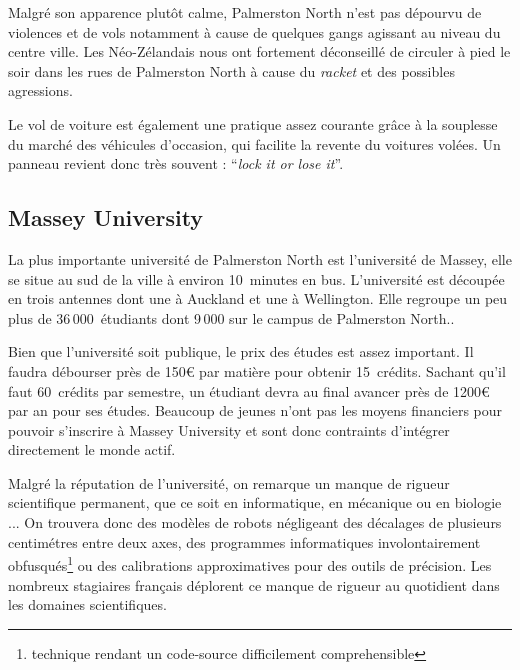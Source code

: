 \documentclass[11pt,journal]{RapportFR}
\newcommand{\Nzs}{N\'eo-Z\'elandais\xspace}
\newcommand{\PM}{Palmerston North\xspace}
\begin{document}
Malgr\'e son apparence plut\^ot calme, \PM n'est pas d\'epourvu de violences et de vols notamment \`a cause de quelques gangs agissant au niveau du centre ville.
Les \Nzs nous ont fortement déconseillé de circuler \`a pied le soir dans les rues de \PM à cause du \emph{racket} et des possibles agressions.

Le vol de voiture est également une pratique assez courante gr\^ace \`a la souplesse du march\'e des v\'ehicules d'occasion, qui facilite la revente du voitures volées. Un panneau revient donc tr\`es souvent : ``\emph{lock it or lose it}''.

\vfill

\subsection{Massey University}
\label{sub:massey}

La plus importante universit\'e de \PM est l'universit\'e de Massey, elle se situe au sud de la ville \`a environ 10~minutes en bus.
L'universit\'e est d\'ecoup\'ee en trois antennes dont une \`a Auckland et une \`a Wellington. Elle regroupe un peu plus de 36\,000~\'etudiants dont 9\,000 sur le campus de \PM..

 \vspace{-5mm}

Bien que l'universit\'e soit publique, le prix des \'etudes est assez important. Il faudra d\'ebourser pr\`es de 150\euro\xspace par mati\`ere pour obtenir 15~cr\'edits. 
Sachant qu'il faut 60~cr\'edits par semestre, un \'etudiant devra au final avancer pr\`es de 1200\euro\xspace par an pour ses \'etudes.
Beaucoup de jeunes n'ont pas les moyens financiers pour pouvoir s'inscrire \`a Massey University et sont donc contraints d'int\'egrer directement le monde actif.



Malgr\'e la r\'eputation de l'universit\'e, on remarque un manque de rigueur scientifique permanent, que ce soit en informatique, en m\'ecanique ou en biologie ...
On trouvera donc des mod\`eles de robots n\'egligeant des d\'ecalages de plusieurs centim\'etres entre deux axes, des programmes informatiques involontairement obfusqu\'es\footnote{technique rendant un code-source difficilement comprehensible} ou des calibrations approximatives pour des outils de pr\'ecision.
Les nombreux stagiaires fran\c{c}ais d\'eplorent ce manque de rigueur au quotidient dans les domaines scientifiques.
\end{document}
